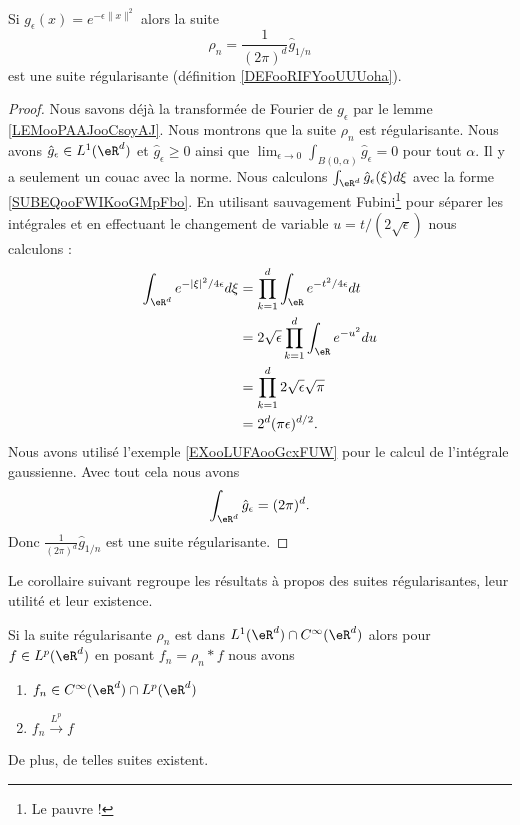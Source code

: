 \begin{lemma}       \label{LEMooTDWSooSBJXdv}
    Si \( g_{\epsilon}(x)= e^{-\epsilon\| x \|^2}\) alors la suite
    \begin{equation}        \label{EQooWQWZooZIYGpq}
        \rho_n=\frac{1}{ (2\pi)^d }\hat g_{1/n}
    \end{equation}
    est une suite régularisante (définition \ref{DEFooRIFYooUUUoha}).
\end{lemma}

\begin{proof}
    Nous savons déjà la transformée de Fourier de \( g_{\epsilon}\) par le lemme \ref{LEMooPAAJooCsoyAJ}. Nous montrons que la suite \( \rho_n\) est régularisante. Nous avons \( \hat g_{\epsilon}\in L^1(\eR^d)\) et \( \hat g_{\epsilon}\geq 0\) ainsi que \( \lim_{\epsilon\to 0}\int_{B(0,\alpha)}\hat  g_{\epsilon}=0\) pour tout \( \alpha\). Il y a seulement un couac avec la norme. Nous calculons \( \int_{\eR^d}\hat g_{\epsilon}(\xi)d\xi\) avec la forme \eqref{SUBEQooFWIKooGMpFbo}. En utilisant sauvagement Fubini\footnote{Le pauvre !} pour séparer les intégrales et en effectuant le changement de variable \( u=t/(2\sqrt{ \epsilon })\) nous calculons :
        \begin{subequations}
            \begin{align}
                \int_{\eR^d} e^{-| \xi |^2/4\epsilon}d\xi&=\prod_{k=1}^d\int_{\eR} e^{-t^2/4\epsilon}dt\\
                &=2\sqrt{ \epsilon }\prod_{k=1}^d\int_{\eR} e^{-u^2}du\\
                &=\prod_{k=1}^d2\sqrt{ \epsilon }\sqrt{ \pi }\\
                &=2^d(\pi\epsilon)^{d/2}.
            \end{align}
        \end{subequations}
        Nous avons utilisé l'exemple \ref{EXooLUFAooGcxFUW} pour le calcul de l'intégrale gaussienne. Avec tout cela nous avons
        \begin{equation}
            \int_{\eR^d}\hat g_{\epsilon}=(2\pi)^d.
        \end{equation}
        Donc \( \frac{1}{ (2\pi)^d }\hat g_{1/n}\) est une suite régularisante.
\end{proof}

Le corollaire suivant regroupe les résultats à propos des suites régularisantes, leur utilité et leur existence.
\begin{corollary}
    Si la suite régularisante \( \rho_n\) est dans \( L^1(\eR^d)\cap  C^{\infty}(\eR^d)\) alors pour \( f\in L^p(\eR^d)\) en posant \( f_n=\rho_n*f\) nous avons
    \begin{enumerate}
        \item
            \( f_n\in C^{\infty}(\eR^d)\cap L^p(\eR^d)\)
        \item
            \( f_n\stackrel{L^p}{\longrightarrow}f\)
    \end{enumerate}
    De plus, de telles suites existent.
\end{corollary}

